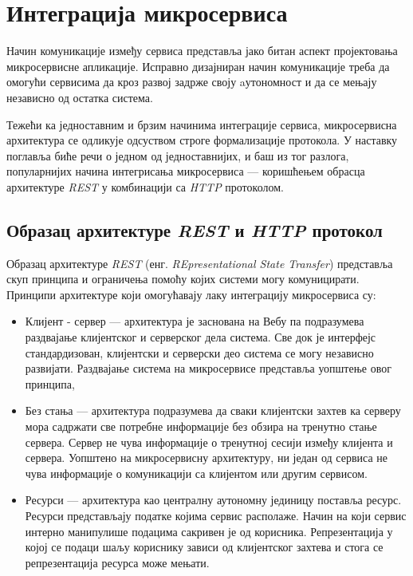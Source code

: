 \documentclass[12pt,oneside]{memoir}
\begin{document}
\newpage

\section{Интеграција микросервиса}

Начин комуникације између сервиса представља јако битан аспект пројектовања микросервисне апликације. Исправно дизајниран начин комуникације треба да омогући сервисима да кроз развој задрже своју aутономност и да се мењају независно од остатка система. 

Тежећи ка једноставним и брзим начинима интеграције сервиса, микросервисна архитектура се одликује одсуством строге формализације протокола. У наставку поглавља биће речи о једном од једноставнијих, и баш из тог разлога, популарнијих начина интегрисања микросервиса  --- коришћењем обрасца архитектуре \textit{REST}  у комбинацији са \textit{HTTP} протоколом.

\subsection{Образац архитектуре \textit{REST} и \textit{HTTP} протокол}

Образац архитектуре \textit{REST} (енг. \textit{REpresentational State Transfer}) представља скуп принципа и ограничења помоћу којих системи могу комуницирати. Принципи архитектуре који омогућавају лаку интеграцију микросервиса су:

\begin{itemize}
\item Клијент - сервер  --- архитектура је заснована на Вебу па подразумева раздвајање клијентског и серверског дела система. Све док је интерфејс стандардизован, клијентски и серверски део система се могу независно развијати. Раздвајање система на микросервисе представља уопштење овог принципа,
\item Без стања --- архитектура подразумева да сваки клијентски захтев ка серверу мора садржати све потребне информације без обзира на тренутно стање сервера. Сервер не чува информације о тренутној сесији између клијента и сервера. Уопштено на микросервисну архитектуру, ни један од сервиса не чува информације о комуникацији са клијентом или другим сервисом.
\item Ресурси --- архитектура као централну аутономну јединицу поставља ресурс. Ресурси представљају податке којима сервис располаже. Начин на који сервис интерно манипулише подацима сакривен је од корисника. Репрезентација у којој се подаци шаљу кориснику зависи од клијентског захтева и стога се репрезентација ресурса може мењати.
\end{itemize}
\end{document}
